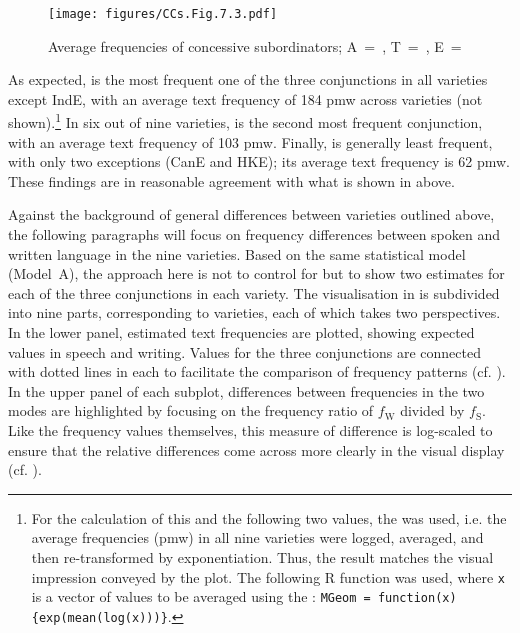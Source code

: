 \begin{figure}
\texttt{[image: figures/CCs.Fig.7.3.pdf]}
\caption{\label{bkm:Ref482364726}\label{fig:7.3}Average frequencies of concessive subordinators; A~=~, T~=~, E~=~}
\end{figure}

As expected,  is the most frequent one of the three conjunctions in all varieties except IndE, with an average text frequency of 184 pmw across varieties (not shown).\footnote{For the calculation of this and the following two values, the  was used, i.e. the average frequencies (pmw) in all nine varieties were logged, averaged, and then re-transformed by exponentiation. Thus, the result matches the visual impression conveyed by the plot. The following R function was used, where \texttt{x} is a vector of values to be averaged using the : \texttt{MGeom = function(x) \{exp(mean(log(x)))\}}.\label{fn81}} In six out of nine varieties,  is the second most frequent conjunction, with an average text frequency of 103 pmw. Finally,  is generally least frequent, with only two exceptions (CanE and HKE); its average text frequency is 62 pmw. These findings are in reasonable agreement with what is shown in  above.\largerpage

\begin{sloppypar}
Against the background of general differences between varieties outlined above, the following paragraphs will focus on frequency differences between spoken and written language in the nine varieties. Based on the same statistical model (Model~A), the approach here is not to control for  but to show two estimates for each of the three conjunctions in each variety. The visualisation in  is subdivided into nine parts, corresponding to varieties, each of which takes two perspectives. In the lower panel, estimated text frequencies are plotted, showing expected values in speech and writing. Values for the three conjunctions are connected with dotted lines in each  to facilitate the comparison of frequency patterns (cf. \citealt{Schützler2023}). In the upper panel of each subplot, differences between frequencies in the two modes are highlighted by focusing on the frequency ratio of $f_{\text{W}}$ divided by $f_{\text{S}}$. Like the frequency values themselves, this measure of difference is log-scaled to ensure that the relative differences come across more clearly in the visual display (cf. \citealt{Schützler2023}).
\end{sloppypar}

